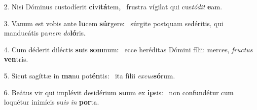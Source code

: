 2. Nisi Dóminus custodíerit \textbf{ci}vi\textbf{tá}tem, \ast\  frustra vígilat qui cus\textit{tó}\textit{dit} \textbf{e}am.\

3. Vanum est vobis ante \textbf{lu}cem \textbf{súr}gere: \ast\  súrgite postquam sedéritis, qui manducátis pa\textit{nem} \textit{do}\textbf{ló}ris.\

4. Cum déderit diléctis \textbf{su}is \textbf{som}num: \ast\  ecce heréditas Dómini fílii: merces, \textit{fruc}\textit{tus} \textbf{ven}tris.\

5. Sicut sagíttæ in \textbf{ma}nu pot\textbf{én}tis: \ast\  ita fílii \textit{ex}\textit{cus}\textbf{só}rum.\

6. Beátus vir qui implévit desidérium \textbf{su}um ex \textbf{ip}sis: \ast\  non confundétur cum loquétur inimícis su\textit{is} \textit{in} \textbf{por}ta.\

